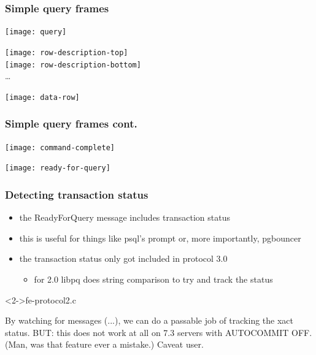 \documentclass{beamer}
\begin{document}
\begin{frame}
  \frametitle{Simple query frames}

  \begin{center}
    \texttt{[image: query]}
  \end{center}

  \bigskip

  \hspace{0.4cm}\texttt{[image: row-description-top]}\;\raisebox{0.2cm}{$+$} \\
  \hspace{0.4cm}\texttt{[image: row-description-bottom]} \\
  \hspace{0.4cm}\dots

  \bigskip

  \begin{center}
    \texttt{[image: data-row]}
  \end{center}

\end{frame}

\begin{frame}
  \frametitle{Simple query frames cont.}

  \begin{center}
    \texttt{[image: command-complete]}
  \end{center}

  \bigskip

  \begin{center}
    \texttt{[image: ready-for-query]}
  \end{center}

\end{frame}

\begin{frame}[fragile]
  \frametitle{Detecting transaction status}

  \begin{itemize}
  \item the ReadyForQuery message includes \alert{transaction status}
  \item this is useful for things like psql's prompt or, more importantly,
    pgbouncer
  \item the transaction status only got included in protocol 3.0
    \begin{itemize}
    \item for 2.0 libpq does string comparison to try and track the status
    \end{itemize}
  \end{itemize}

  \begin{block}<2->{fe-protocol2.c}
    \begin{semiverbatim}
    By watching for messages (...), we can do a passable
    job of tracking the xact status.  BUT: this does not
    work at all on 7.3 servers with AUTOCOMMIT OFF.
    (Man, was that feature ever a mistake.)  Caveat user.
    \end{semiverbatim}
  \end{block}
\end{frame}
\end{document}

